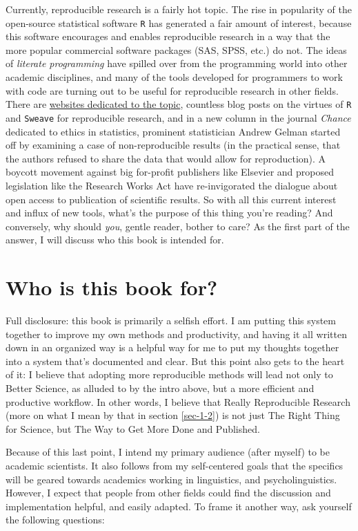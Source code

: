 \documentclass[11pt]{book}
\begin{document}
Currently, reproducible research is a fairly hot topic. The rise in popularity of the open-source statistical software \texttt{R} has generated a fair amount of interest, because this software encourages and enables reproducible research in a way that the more popular commercial software packages (SAS, SPSS, etc.) do not. The ideas of \emph{literate programming} \parencite{knuth1984literate} have spilled over from the programming world into other academic disciplines, and many of the tools developed for programmers to work with code are turning out to be useful for reproducible research in other fields.  There are \href{http://reproducibleresearch.org/}{websites dedicated to the topic}, countless blog posts on the virtues of \texttt{R} and \texttt{Sweave} for reproducible research, and in a new column in the journal \emph{Chance} dedicated to ethics in statistics, prominent statistician Andrew Gelman started off by examining a case of non-reproducible results (in the practical sense, that the authors refused to share the data that would allow for reproduction). A boycott movement against big for-profit publishers like Elsevier and proposed legislation like the Research Works Act have re-invigorated the dialogue about open access to publication of scientific results. So with all this current interest and influx of new tools, what's the purpose of this thing you're reading?  And conversely, why should \emph{you}, gentle reader, bother to care?  As the first part of the answer, I will discuss who this book is intended for.
\section{Who is this book for?}
\label{sec-1-1-2}

Full disclosure: this book is primarily a selfish effort. I am putting this system together to improve my own methods and productivity, and having it all written down in an organized way is a helpful way for me to put my thoughts together into a system that's documented and clear. But this point also gets to the heart of it: I believe that adopting more reproducible methods will lead not only to Better Science, as alluded to by the intro above, but a more efficient and productive workflow. In other words, I believe that Really Reproducible Research (more on what I mean by that in section \ref{sec-1-2}) is not just The Right Thing for Science, but The Way to Get More Done and Published.

Because of this last point, I intend my primary audience (after myself) to be academic scientists. It also follows from my self-centered goals that the specifics will be geared towards academics working in linguistics, and psycholinguistics. However, I expect that people from other fields could find the discussion and implementation helpful, and easily adapted. To frame it another way, ask yourself the following questions:
\end{document}

